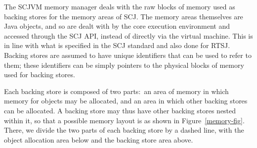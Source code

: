 The SCJVM memory manager deals with the raw blocks of memory used as
backing stores for the memory areas of SCJ.
The memory areas themselves are Java objects, and so are dealt with by
the core execution environment and accessed through the SCJ API,
instead of directly via the virtual machine.
This is in line with what is specified in the SCJ standard and also
done for RTSJ.
Backing stores are assumed to have unique identifiers that can be used
to refer to them; these identifiers can be simply pointers to the
physical blocks of memory used for backing stores.

Each backing store is composed of two parts:~an area of memory in
which memory for objects may be allocated, and an area in which other
backing stores can be allocated.
A backing store may thus have other backing stores nested within it,
so that a possible memory layout is as shown in
Figure~\ref{memory-fig}.
There, we divide the two parts of each backing store by a dashed line,
with the object allocation area below and the backing store area
above.

